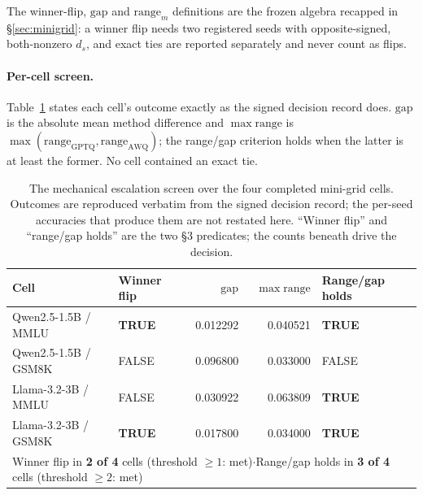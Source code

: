 The winner-flip, $\mathrm{gap}$ and $\mathrm{range}_m$ definitions are the frozen
algebra recapped in \S\ref{sec:minigrid}: a winner flip needs two registered
seeds with opposite-signed, both-nonzero $d_s$, and exact ties are reported
separately and never count as flips.

\paragraph{Per-cell screen.}
Table~\ref{tab:minigrid-escalation} states each cell's outcome exactly as the
signed decision record does. $\mathrm{gap}$ is the absolute mean method
difference and $\max\mathrm{range}$ is
$\max(\mathrm{range}_{\mathrm{GPTQ}},\mathrm{range}_{\mathrm{AWQ}})$; the
range/gap criterion holds when the latter is at least the former. No cell
contained an exact tie.

\begin{table}[t]
\centering
\small
\caption{The mechanical escalation screen over the four completed mini-grid
cells. Outcomes are reproduced verbatim from the signed decision record; the
per-seed accuracies that produce them are not restated here. ``Winner flip''
and ``range/gap holds'' are the two \S3 predicates; the counts beneath drive the
decision.}
\label{tab:minigrid-escalation}
\begin{tabular}{llrrl}
\toprule
Cell & Winner flip & $\mathrm{gap}$ & $\max\mathrm{range}$ & Range/gap holds \\
\midrule
Qwen2.5-1.5B / MMLU  & \textbf{TRUE}  & 0.012292 & 0.040521 & \textbf{TRUE} \\
Qwen2.5-1.5B / GSM8K & FALSE          & 0.096800 & 0.033000 & FALSE \\
Llama-3.2-3B / MMLU  & FALSE          & 0.030922 & 0.063809 & \textbf{TRUE} \\
Llama-3.2-3B / GSM8K & \textbf{TRUE}  & 0.017800 & 0.034000 & \textbf{TRUE} \\
\midrule
\multicolumn{5}{l}{Winner flip in \textbf{2 of 4} cells (threshold $\geq 1$: met)\quad$\cdot$\quad Range/gap holds in \textbf{3 of 4} cells (threshold $\geq 2$: met)} \\
\bottomrule
\end{tabular}
\end{table}

